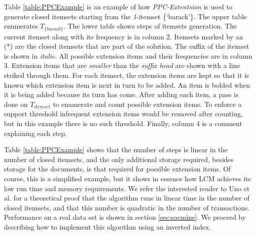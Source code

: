 \documentclass[letterpaper,12pt,titlepage,oneside,final]{book}
\begin{document}
Table \ref{table:PPCExample} is an example of how \emph{PPC-Extentsion} is
used to generate closed itemsets starting from the
\emph{1}-itemset \{`barack'\}.
The upper table enumerates $T_{\{barack\}}$.
The lower table shows steps of itemsets generation.
The current itemset along with its frequency is in column 2.
Itemsets marked by an (*) are the closed itemsets that are part of the solution.
The suffix of the itemset is shown in \emph{italic}. %
All possible extension items and their frequencies are in column 3. 
Extension items that are \emph{smaller} than the \emph{suffix head} 
are shown with a line striked through them. 
For each itemset, the extension items are kept 
so that it is known which extension item 
is next in turn to be added.
An item is bolded when it is being added because its turn has come. %
After adding each item, a pass is done on $T_{itemset}$ to 
enumerate and count possible extension items.
To enforce a support threshold infrequent extension items would be removed
after counting, %
but in this example there is no such threshold.
Finally, column 4 is a comment explaining each step.

Table \ref{table:PPCExample} shows that the number of steps is linear in the number of closed itemsets,
and the only additional storage required, besides storage for the documents,
is that required for possible extension items.
Of course, this is a simplified example, but it shows in essence how LCM
achieves its low run time and memory requirements.
We refer the interested reader to Uno et al.\cite{uno2004lcm} for a
theoretical proof that the algorithm runs in linear time in the number of
closed itemsets,
and that this number is quadratic in the number of transactions.
Performance on a real data set is shown in section \ref{sec:socmine}.
We proceed by describing how to implement this algorithm using an inverted
index.
\end{document}
